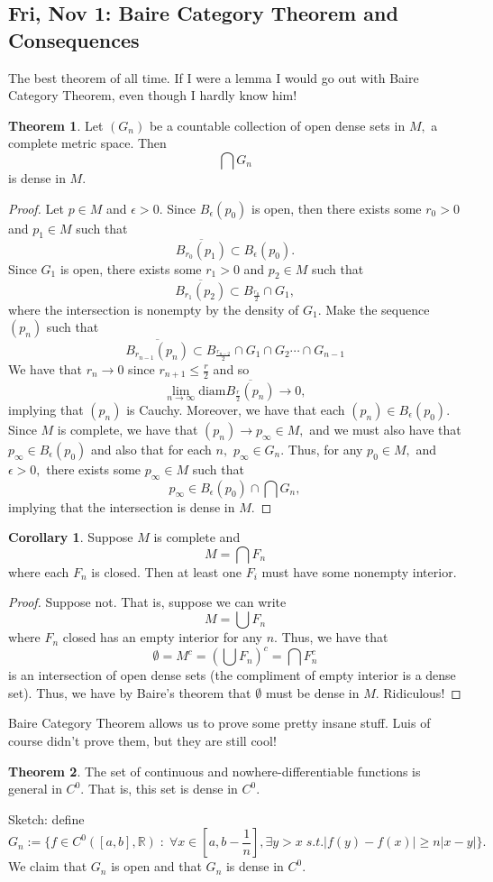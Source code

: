 \documentclass[10pt, oneside]{article}
\newcommand{\bbR}{\mathbb{R}}
\theoremstyle{definition}
\newtheorem{thm}{Theorem}
\newtheorem{cor}{Corollary}
\begin{document}
\newpage
\subsection{Fri, Nov 1: Baire Category Theorem and Consequences}
The best theorem of all time. If I were a lemma I would go out with Baire Category Theorem, even though I hardly know him!
\begin{thm}
    Let $(G_n)$ be a countable collection of open dense sets in $M,$ a complete metric space. Then 
    \[\bigcap G_n\] is dense in $M.$
\end{thm}
\begin{proof}
    Let $p \in M$ and $\epsilon>0.$ Since $B_\epsilon(p_0)$ is open, then there exists some $r_0>0$ and $p_1 \in M$ such that
    \[\overline{B_{r_0}(p_1)}\subset B_\epsilon(p_0).\] Since $G_1$ is open, there exists some $r_1>0$ and $p_2 \in M$ such that 
    \[\overline{B_{r_1}(p_2)}\subset B_{\frac{r_0}{2}}\cap G_1,\] where the intersection is nonempty by the density of $G_1.$ Make the sequence $(p_n)$ such that
    \[\overline{B_{r_{n-1}}(p_n)} \subset B_{\frac{r_{n-2}}{2}}\cap G_1 \cap G_2 \cdots \cap G_{n-1}\] We have that $r_n \to 0$ since $r_{n+1}\leq \frac{r}{2}$ and so 
    \[\lim_{n\to \infty}\text{diam}\overline{B_{\frac{r}{2}}(p_n)}\to 0,\] implying that $(p_n)$ is Cauchy. Moreover, we have that each $(p_n)\in B_\epsilon(p_0).$ Since $M$ is complete, we have that $(p_n)\to p_\infty\in M,$ and we must also have that $p_\infty \in B_\epsilon(p_0)$ and also that for each $n,$ $p_\infty \in G_n.$ Thus, for any $p_0 \in M,$ and $\epsilon>0,$ there exists some $p_\infty \in M$ such that 
    \[p_\infty \in B_\epsilon(p_0)\cap \bigcap G_n,\] implying that the intersection is dense in $M.$ 
\end{proof}
\begin{cor}
    Suppose $M$ is complete and 
    \[M = \bigcap F_n\] where each $F_n$ is closed. Then at least one $F_i$ must have some nonempty interior.
\end{cor}
\begin{proof}
    Suppose not. That is, suppose we can write 
    \[M = \bigcup F_n\] where $F_n$ closed has an empty interior for any $n.$ Thus, we have that 
    \[\emptyset = M^c = (\bigcup F_n)^c= \bigcap F_n^c\] is an intersection of open dense sets (the compliment of empty interior is a dense set). Thus, we have by Baire's theorem that $\emptyset$ must be dense in $M.$ Ridiculous! 
\end{proof}
Baire Category Theorem allows us to prove some pretty insane stuff. Luis of course didn't prove them, but they are still cool!
\begin{thm}
    The set of continuous and nowhere-differentiable functions is general in $C^0.$ That is, this set is dense in $C^0.$
\end{thm}
Sketch: define
\[G_n := \{f \in C^0([a,b], \bbR)\; : \; \forall x\in [a, b-\frac{1}{n}], \exists y>x \; s.t. |f(y)-f(x)|\geq n|x-y|\}.\] We claim that $G_n$ is open and that $G_n$ is dense in $C^0.$ 
\end{document}
